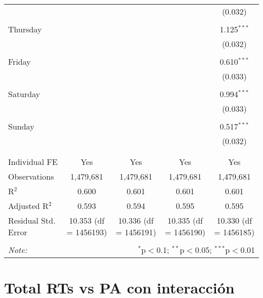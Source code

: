 \documentclass[
]{article}
\begin{document}
\begin{table}[!htbp]
{\begin{tabular}{@{\extracolsep{5pt}}lcccc}
  &  &  &  & (0.032) \\ 
  & & & & \\ 
 Thursday &  &  &  & 1.125$^{***}$ \\ 
  &  &  &  & (0.032) \\ 
  & & & & \\ 
 Friday &  &  &  & 0.610$^{***}$ \\ 
  &  &  &  & (0.033) \\ 
  & & & & \\ 
 Saturday &  &  &  & 0.994$^{***}$ \\ 
  &  &  &  & (0.033) \\ 
  & & & & \\ 
 Sunday &  &  &  & 0.517$^{***}$ \\ 
  &  &  &  & (0.032) \\ 
  & & & & \\ 
\hline \\[-1.8ex] 
Individual FE & Yes & Yes & Yes & Yes \\ 
Observations & 1,479,681 & 1,479,681 & 1,479,681 & 1,479,681 \\ 
R$^{2}$ & 0.600 & 0.601 & 0.601 & 0.601 \\ 
Adjusted R$^{2}$ & 0.593 & 0.594 & 0.595 & 0.595 \\ 
Residual Std. Error & 10.353 (df = 1456193) & 10.336 (df = 1456191) & 10.335 (df = 1456190) & 10.330 (df = 1456185) \\ 
\hline 
\hline \\[-1.8ex] 
\textit{Note:}  & \multicolumn{4}{r}{$^{*}$p$<$0.1; $^{**}$p$<$0.05; $^{***}$p$<$0.01} \\ 
\end{tabular}
} 
\end{table} 
\newpage
\section{Total RTs vs PA con interacción}
\end{document}
